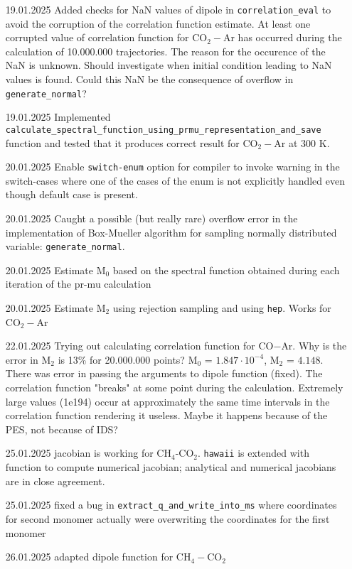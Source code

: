 \documentclass[color]{article}
\begin{document}
\begin{enumerate}
    \item [19.01.2025] Added checks for NaN values of dipole in \texttt{correlation\_eval} to avoid the corruption of the correlation function estimate. At least one corrupted value of correlation function for CO$_2-$Ar  has occurred during the calculation of 10.000.000 trajectories. {\color{red} The reason for the occurence of the NaN is unknown. Should investigate when initial condition leading to NaN values is found.} Could this NaN be the consequence of overflow in \texttt{generate\_normal}?
    \item [19.01.2025] Implemented \texttt{calculate\_spectral\_function\_using\_prmu\_representation\_and\_save} function and tested that it produces correct result for CO$_2-$Ar at 300 K.
    \item [20.01.2025] Enable \texttt{switch-enum} option for compiler to invoke warning in the switch-cases where one of the cases of the enum is not explicitly handled even though default case is present. 
    \item [20.01.2025] Caught a possible (but really rare) overflow error in the implementation of Box-Mueller algorithm for sampling normally distributed variable: \texttt{generate\_normal}. 
    \item [20.01.2025] Estimate M$_0$ based on the spectral function obtained during each iteration of the pr-mu calculation
    \item [20.01.2025] Estimate M$_2$ using rejection sampling and using \texttt{hep}. Works for CO$_2-$Ar
    \item [22.01.2025] Trying out calculating correlation function for CO$-$Ar. Why is the error in M$_2$ is 13\% for 20.000.000 points? M$_0$ = $1.847 \cdot 10^{-4}$, M$_2$ = $4.148$. There was error in passing the arguments to dipole function (fixed). The correlation function "breaks" at some point during the calculation. Extremely large values (1e194) occur at approximately the same time intervals in the correlation function rendering it useless. Maybe it happens because of the PES, not because of IDS?  
    \item [25.01.2025] jacobian is working for CH$_4$-CO$_2$. \texttt{hawaii} is extended with function to compute numerical jacobian; analytical and numerical jacobians are in close agreement.
    \item [25.01.2025] fixed a bug in \texttt{extract\_q\_and\_write\_into\_ms} where coordinates for second monomer actually were overwriting the coordinates for the first monomer 
    \item [26.01.2025] adapted dipole function for CH$_4-$CO$_2$

\end{enumerate}
\end{document}
